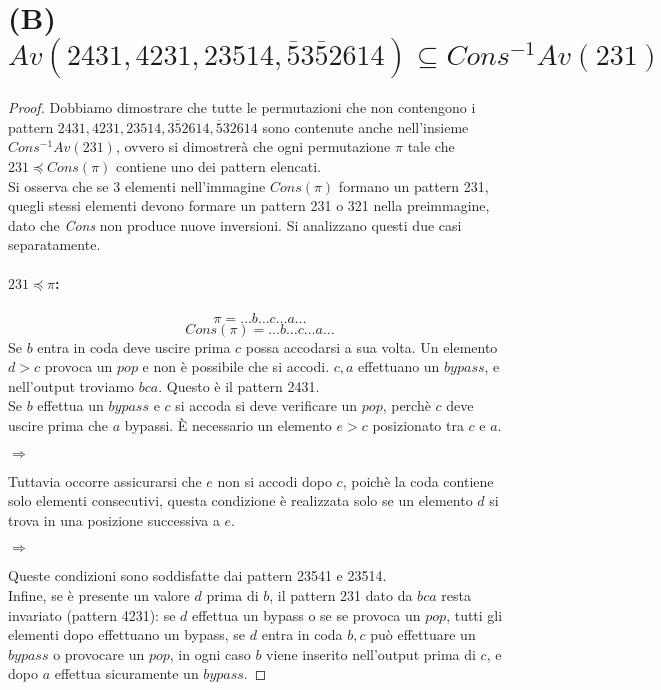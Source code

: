 \documentclass[10pt,a4paper]{article}
\begin{document}
\section*{(B) $Av(2431, 4231, 23514, \overline{5}3\overline{5}2614) \subseteq Cons^{-1}Av(231)$}
\begin{proof}
Dobbiamo dimostrare che tutte le permutazioni che non contengono i pattern $2431, 4231, 23514, 3\overline{5}2614, \overline{5}32614$ sono contenute anche nell'insieme $Cons^{-1}Av(231)$, ovvero si dimostrerà che ogni permutazione $\pi$ tale che $231\preceq{Cons}(\pi)$ contiene uno dei pattern elencati.\\
Si osserva che se 3 elementi nell'immagine $Cons(\pi)$ formano un pattern 231, quegli stessi elementi devono formare un pattern 231 o 321 nella preimmagine, dato che \textit{Cons} non produce nuove inversioni. Si analizzano questi due casi separatamente.
\paragraph*{$231\preceq\pi$:}$$\pi=\dots b\dots c\dots a\dots$$$$Cons(\pi)=\dots b\dots c\dots a\dots$$
Se $b$ entra in coda deve uscire prima $c$ possa accodarsi a sua volta. Un elemento $d>c$ provoca un $pop$ e non è possibile che si accodi. $c,a$ effettuano un $bypass$, e nell'output troviamo $bca$. Questo è il pattern 2431.\\
Se $b$ effettua un $bypass$ e $c$ si accoda si deve verificare un $pop$, perchè $c$ deve uscire prima che $a$ bypassi. È necessario un elemento $e>c$ posizionato tra $c$ e $a$.
\begin{center}
$\Rightarrow$
\end{center}
Tuttavia occorre assicurarsi che $e$ non si accodi dopo $c$, poichè la coda contiene solo elementi consecutivi, questa condizione è realizzata solo se un elemento $d$ si trova in una posizione successiva a $e$.
\begin{center}
$\Rightarrow$
\end{center}
Queste condizioni sono soddisfatte dai pattern 23541 e 23514.\\
Infine, se è presente un valore $d$ prima di $b$, il pattern 231 dato da $bca$ resta invariato (pattern 4231): se $d$ effettua un bypass o se se provoca un $pop$, tutti gli elementi dopo effettuano un bypass, se $d$ entra in coda $b,c$ può effettuare un $bypass$ o provocare un $pop$, in ogni caso $b$ viene inserito nell'output prima di $c$, e dopo $a$ effettua sicuramente un $bypass$.

\end{proof}
\end{document}
